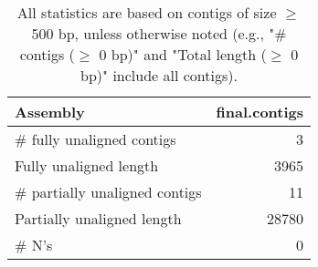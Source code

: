 \documentclass[12pt,a4paper]{article}
\begin{document}
\begin{table}[ht]
\begin{center}
\caption{All statistics are based on contigs of size $\geq$ 500 bp, unless otherwise noted (e.g., "\# contigs ($\geq$ 0 bp)" and "Total length ($\geq$ 0 bp)" include all contigs).}
\begin{tabular}{|l*{1}{|r}|}
\hline
Assembly & final.contigs \\ \hline
\# fully unaligned contigs & 3 \\ \hline
Fully unaligned length & 3965 \\ \hline
\# partially unaligned contigs & 11 \\ \hline
Partially unaligned length & 28780 \\ \hline
\# N's & 0 \\ \hline
\end{tabular}
\end{center}
\end{table}
\end{document}
